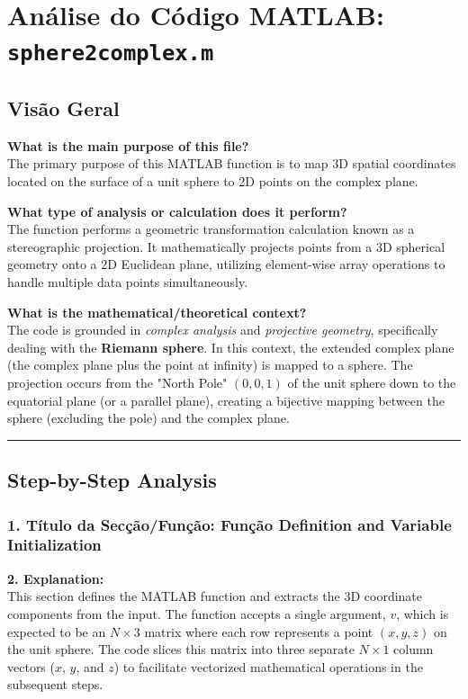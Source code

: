 
\chapter{Análise do Código MATLAB: \texttt{sphere2complex.m}}
\section{Visão Geral}

\textbf{What is the main purpose of this file?}\\
The primary purpose of this MATLAB function is to map 3D spatial coordinates located on the surface of a unit sphere to 2D points on the complex plane.

\textbf{What type of analysis or calculation does it perform?}\\
The function performs a geometric transformation calculation known as a stereographic projection. It mathematically projects points from a 3D spherical geometry onto a 2D Euclidean plane, utilizing element-wise array operations to handle multiple data points simultaneously.

\textbf{What is the mathematical/theoretical context?}\\
The code is grounded in \textit{complex analysis} and \textit{projective geometry}, specifically dealing with the \textbf{Riemann sphere}. In this context, the extended complex plane (the complex plane plus the point at infinity) is mapped to a sphere. The projection occurs from the "North Pole" $(0, 0, 1)$ of the unit sphere down to the equatorial plane (or a parallel plane), creating a bijective mapping between the sphere (excluding the pole) and the complex plane. 

\vspace{1em}
\hrule
\vspace{1em}

\section{Step-by-Step Analysis}

\subsection*{1. Título da Secção/Função: Função Definition and Variable Initialization}
\textbf{2. Explanation:} \\
This section defines the MATLAB function and extracts the 3D coordinate components from the input. The function accepts a single argument, $v$, which is expected to be an $N \times 3$ matrix where each row represents a point $(x, y, z)$ on the unit sphere. The code slices this matrix into three separate $N \times 1$ column vectors ($x$, $y$, and $z$) to facilitate vectorized mathematical operations in the subsequent steps.


